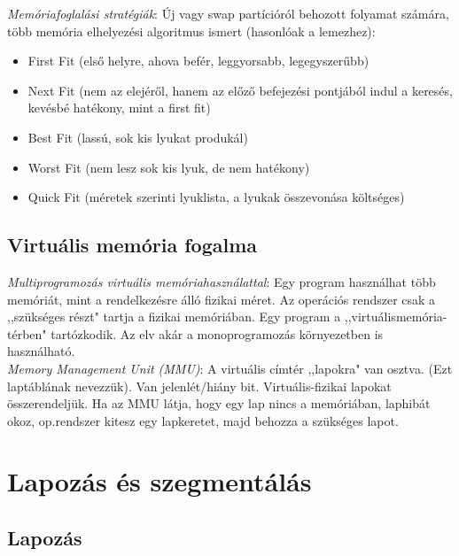 \documentclass[margin=0px]{article}
\begin{document}
	\textit{Memóriafoglalási stratégiák}: Új vagy swap partícióról behozott folyamat számára, több memória elhelyezési	algoritmus ismert (hasonlóak a lemezhez):
	\begin{itemize}
		\item First Fit (első helyre, ahova befér, leggyorsabb, legegyszerűbb)
		\item Next Fit (nem az elejéről, hanem az előző befejezési pontjából indul a keresés, kevésbé hatékony, mint a first fit)
		\item Best Fit (lassú, sok kis lyukat produkál)
		\item Worst Fit (nem lesz sok kis lyuk, de nem hatékony)
		\item Quick Fit (méretek szerinti lyuklista, a lyukak összevonása költséges)
	\end{itemize}
	
	\subsection{Virtuális memória fogalma}
	
	\textit{Multiprogramozás virtuális memóriahasználattal}: Egy program használhat több memóriát,
	mint a rendelkezésre álló fizikai méret. Az operációs rendszer csak a ,,szükséges részt" tartja a fizikai memóriában. Egy program a ,,virtuálismemória-térben" tartózkodik. Az elv akár a monoprogramozás környezetben is használható. \\
	\textit{Memory Management Unit (MMU)}: A virtuális címtér ,,lapokra" van osztva. (Ezt laptáblának
	nevezzük). Van jelenlét/hiány bit. Virtuális-fizikai lapokat összerendeljük. Ha az MMU látja, hogy egy lap nincs a memóriában, laphibát okoz, op.rendszer kitesz egy lapkeretet, majd behozza a szükséges lapot.
	
	\section{Lapozás és szegmentálás}
	
	\subsection{Lapozás}
	
\end{document}
